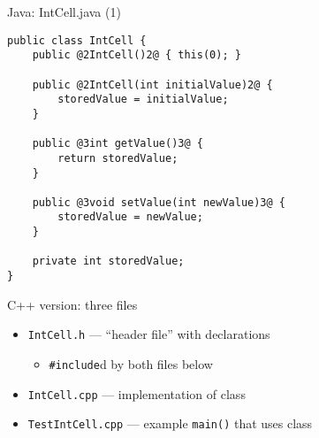 \begin{frame}[fragile,label=intCellJava]{Java: IntCell.java (1)}
\begin{lstlisting}
public class IntCell {
    public @2IntCell()2@ { this(0); }

    public @2IntCell(int initialValue)2@ {
        storedValue = initialValue;
    }

    public @3int getValue()3@ {
        return storedValue;
    }

    public @3void setValue(int newValue)3@ {
        storedValue = newValue;
    }

    private int storedValue;
}
\end{lstlisting}
\end{frame}

\begin{frame}[fragile,label=cppIntCellThree]{C++ version: three files}
\begin{itemize}
\item {\tt IntCell.h} --- ``header file'' with declarations 
    \begin{itemize}
    \item {\tt \#include}d by both files below
    \end{itemize}
\item {\tt IntCell.cpp} --- implementation of class
\item {\tt TestIntCell.cpp} --- example {\tt main()} that uses class
\end{itemize}
\end{frame}

